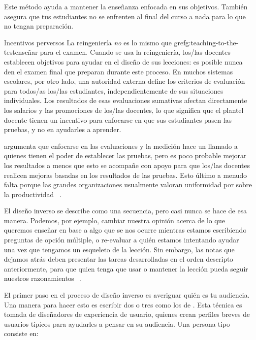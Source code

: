 Este método ayuda a mantener la enseñanza enfocada en sus objetivos.
También asegura que tus estudiantes no se enfrenten al final del curso
a nada para lo que no tengan preparación.
 
\begin{aside}{Incentivos perversos}
La reingeniería \emph{no} es lo mismo que gref{g:teaching-to-the-test}{enseñar para el examen}.
Cuando se usa la reingeniería,
los/las docentes establecen objetivos para ayudar en el diseño de sus lecciones:
es posible nunca den el examen final que preparan durante este proceso.
En muchos sistemas escolares,
por otro lado,
una autoridad externa define los criterios de evaluación para todos/as los/las estudiantes,
independientemente de sus situaciones individuales.
Los resultados de esas evaluaciones sumativas afectan directamente los salarios y las promociones de los/las docentes,
lo que significa que el plantel docente tienen un incentivo para enfocarse en que sus estudiantes pasen las pruebas, y no en ayudarles a aprender.
 
\cite{Gree2014} argumenta que enfocarse en las evaluaciones y la medición hace un llamado a quienes tienen el poder de establecer las pruebas, pero es poco probable mejorar los resultados
a menos que esto se acompañe con apoyo para que los/las docentes realicen mejoras basadas en los resultados de las pruebas.
Esto último a menudo falta porque
las grandes organizaciones usualmente valoran uniformidad por sobre la productividad ~\cite{Scot1998}.
\end{aside}
 
El diseño inverso se describe como una secuencia,
pero casi nunca se hace de esa manera.
Podemos,
por ejemplo, cambiar nuestra opinión acerca de lo que queremos enseñar
en base a algo que se nos ocurre mientras estamos escribiendo preguntas de opción múltiple,
o re-evaluar a quién estamos intentando ayudar una vez que tengamos un esqueleto de la lección.
Sin embargo,
las notas que dejamos atrás deben presentar las tareas desarrolladas en el orden descripto anteriormente, para que quien tenga que usar o mantener la lección pueda seguir nuestros razonamientos
~\cite{Parn1986}.
 
 
El primer paso en el proceso de diseño inverso es averiguar quién es tu audiencia.
Una manera para hacer esto es escribir dos o tres
como los de .
Esta técnica es tomada de diseñadores de experiencia de usuario,
quienes crean perfiles breves de usuarios típicos
para ayudarles a pensar en su audiencia.
Una persona tipo consiste en:
 
